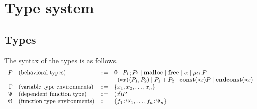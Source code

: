 
\section{Type system}
\label{sec:typesystem}

\subsection{Types}

The syntax of the types is as follows.
\[
\begin{array}{rlcl}
  P & (\mbox{behavioral types})&::=& {\bf 0} \mid P_{1};P_{2}  \mid \mathbf{malloc} \mid \mathbf{free} \mid \alpha \mid \mu\alpha.P \\
  &  &  & \mid (*x)(P_1,P_2) \mid P_1 + P_2 \mid \mathbf{const}(*x) P  \mid \mathbf{endconst}(*x)\\
  \Gamma & (\mbox{variable type environments}) &::=& \{x_1, x_2, \dots, x_n\}\\
  \Psi & (\mbox{dependent function type}) &::=& (\vec{x})P\\
  \Theta & (\mbox{function type environments}) &::=& \{f_1\!:\! \Psi_1,\dots,f_n\!:\! \Psi_n\}\\
\end{array}
\]














